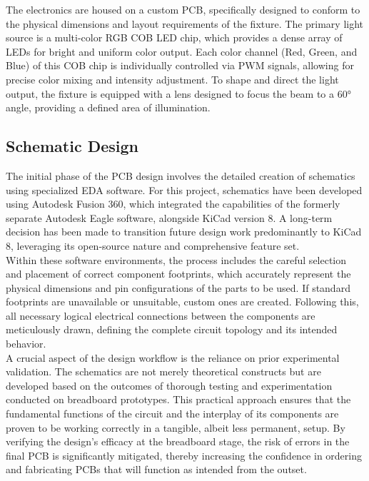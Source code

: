 The electronics are housed on a custom \ac{PCB}, specifically designed to conform to the physical dimensions and layout requirements of the fixture. The primary light source is a multi-color \ac{RGB} \ac{COB} \ac{LED} chip, which provides a dense array of \ac{LED}s for bright and uniform color output. Each color channel (Red, Green, and Blue) of this \ac{COB} chip is individually controlled via \ac{PWM} signals, allowing for precise color mixing and intensity adjustment. To shape and direct the light output, the fixture is equipped with a lens designed to focus the beam to a 60° angle, providing a defined area of illumination.

\subsection{Schematic Design}
The initial phase of the \ac{PCB} design involves the detailed creation of schematics using specialized \ac{EDA} software. For this project, schematics have been developed using Autodesk Fusion 360, which integrated the capabilities of the formerly separate Autodesk Eagle software, alongside KiCad version 8. A long-term decision has been made to transition future design work predominantly to KiCad 8, leveraging its open-source nature and comprehensive feature set. \\

Within these software environments, the process includes the careful selection and placement of correct component footprints, which accurately represent the physical dimensions and pin configurations of the parts to be used. If standard footprints are unavailable or unsuitable, custom ones are created. Following this, all necessary logical electrical connections between the components are meticulously drawn, defining the complete circuit topology and its intended behavior. \\

A crucial aspect of the design workflow is the reliance on prior experimental validation. The schematics are not merely theoretical constructs but are developed based on the outcomes of thorough testing and experimentation conducted on breadboard prototypes. This practical approach ensures that the fundamental functions of the circuit and the interplay of its components are proven to be working correctly in a tangible, albeit less permanent, setup. By verifying the design's efficacy at the breadboard stage, the risk of errors in the final \ac{PCB} is significantly mitigated, thereby increasing the confidence in ordering and fabricating \ac{PCB}s that will function as intended from the outset.

